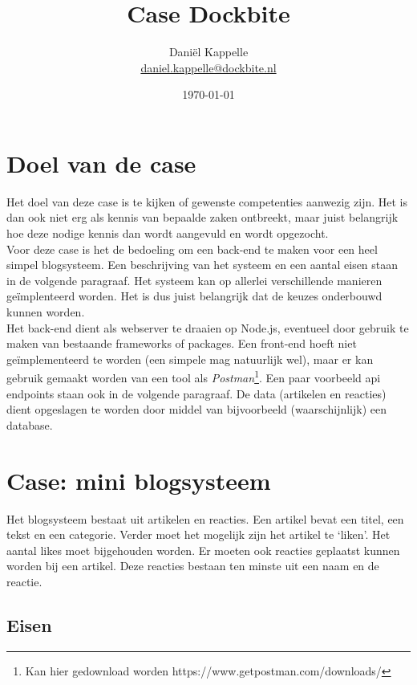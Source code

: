 \documentclass[a4paper]{article}
\title{Case Dockbite}
\date{\today}
\author{Dani\"el Kappelle\\ \href{mailto:daniel.kappelle@dockbite.nl}{daniel.kappelle@dockbite.nl}}
\begin{document}
\maketitle

\section{Doel van de case}
Het doel van deze case is te kijken of gewenste competenties aanwezig zijn. Het is dan ook niet erg als kennis van bepaalde zaken ontbreekt, maar juist belangrijk hoe deze nodige kennis dan wordt aangevuld en wordt opgezocht.\\

Voor deze case is het de bedoeling om een back-end te maken voor een heel simpel blogsysteem. Een beschrijving van het systeem en een aantal eisen staan in de volgende paragraaf. Het systeem kan op allerlei verschillende manieren ge\"implenteerd worden. Het is dus juist belangrijk dat de keuzes onderbouwd kunnen worden.\\

Het back-end dient als webserver te draaien op Node.js, eventueel door gebruik te maken van bestaande frameworks of packages. Een front-end hoeft niet ge\"implementeerd te worden (een simpele mag natuurlijk wel), maar er kan gebruik gemaakt worden van een tool als {\it Postman}\footnote{Kan hier gedownload worden https://www.getpostman.com/downloads/}. Een paar voorbeeld api endpoints staan ook in de volgende paragraaf. De data (artikelen en reacties) dient opgeslagen te worden door middel van bijvoorbeeld (waarschijnlijk) een database.

\section{Case: mini blogsysteem}
Het blogsysteem bestaat uit artikelen en reacties. Een artikel bevat een titel, een tekst en een categorie. Verder moet het mogelijk zijn het artikel te `liken'. Het aantal likes moet bijgehouden worden. Er moeten ook reacties geplaatst kunnen worden bij een artikel. Deze reacties bestaan ten minste uit een naam en de reactie.\\


\subsection{Eisen}
\end{document}
